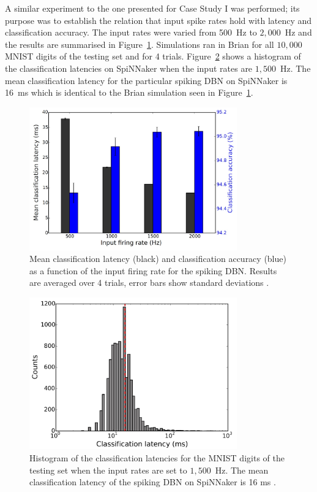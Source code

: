 A similar experiment to the one presented for Case Study I was performed; its purpose was to establish the relation that input spike rates hold with latency and classification accuracy.
The input rates were varied from 500~Hz to $2,000$~Hz and the results are summarised in Figure~\ref{Fig:brianLatency}. Simulations ran in Brian for all $10,000$ MNIST digits of the testing set and for 4 trials. Figure~\ref{Fig:spinnLatency1500hz} shows a histogram of the classification latencies on SpiNNaker when the input rates are $1,500$~Hz. The mean classification latency for the particular spiking DBN on SpiNNaker is 16~ms which is identical to the Brian simulation seen in Figure~\ref{Fig:brianLatency}.


\begin{figure}[hbt!]
	\centering
	\includegraphics[width=0.8\textwidth]{pics_bench/fig10}
	\caption{Mean classification latency (black) and classification accuracy (blue) as a function of the input firing rate for the spiking DBN. Results are averaged over 4 trials, error bars show standard deviations \cite{Stromatias2015scalable}.}
	\label{Fig:brianLatency}
\end{figure} 



\begin{figure}[hbt!]
	\centering
	\includegraphics[width=0.8\textwidth]{pics_bench/fig11}
	\caption{Histogram of the classification latencies for the MNIST digits of the testing set when the input rates are set to $1,500$~Hz. The mean classification latency of the spiking DBN on SpiNNaker is 16 ms \cite{Stromatias2015scalable}.}
	\label{Fig:spinnLatency1500hz}
\end{figure} 

